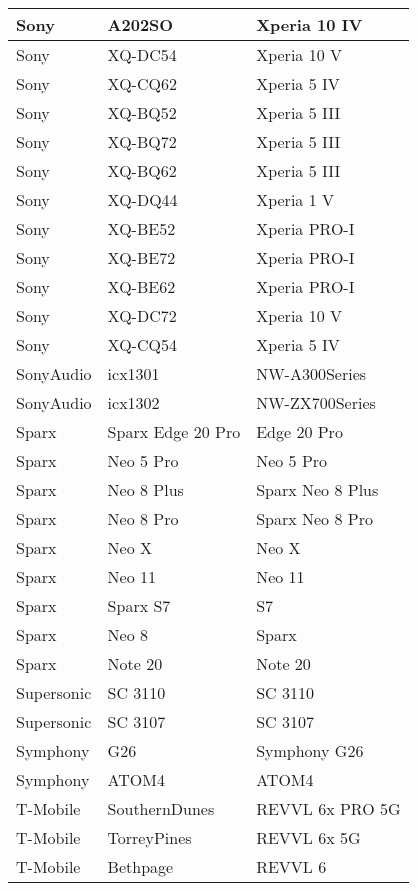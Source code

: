 \begin{tabularx}{\linewidth}{|l|X|X|}
        Sony & A202SO & Xperia 10 IV \\ \hline
        Sony & XQ-DC54 & Xperia 10 V \\ \hline
        Sony & XQ-CQ62 & Xperia 5 IV \\ \hline
        Sony & XQ-BQ52 & Xperia 5 III \\ \hline
        Sony & XQ-BQ72 & Xperia 5 III \\ \hline
        Sony & XQ-BQ62 & Xperia 5 III \\ \hline
        Sony & XQ-DQ44 & Xperia 1 V \\ \hline
        Sony & XQ-BE52 & Xperia PRO-I \\ \hline
        Sony & XQ-BE72 & Xperia PRO-I \\ \hline
        Sony & XQ-BE62 & Xperia PRO-I \\ \hline
        Sony & XQ-DC72 & Xperia 10 V \\ \hline
        Sony & XQ-CQ54 & Xperia 5 IV \\ \hline
        SonyAudio & icx1301 & NW-A300Series \\ \hline
        SonyAudio & icx1302 & NW-ZX700Series \\ \hline
        Sparx & Sparx Edge 20 Pro & Edge 20 Pro \\ \hline
        Sparx & Neo 5 Pro & Neo 5 Pro \\ \hline
        Sparx & Neo 8 Plus & Sparx Neo 8 Plus \\ \hline
        Sparx & Neo 8 Pro & Sparx Neo 8 Pro \\ \hline
        Sparx & Neo X & Neo X \\ \hline
        Sparx & Neo 11 & Neo 11 \\ \hline
        Sparx & Sparx S7 & S7 \\ \hline
        Sparx & Neo 8 & Sparx \\ \hline
        Sparx & Note 20 & Note 20 \\ \hline
        Supersonic & SC 3110 & SC 3110 \\ \hline
        Supersonic & SC 3107 & SC 3107 \\ \hline
        Symphony & G26 & Symphony G26 \\ \hline
        Symphony & ATOM4 & ATOM4 \\ \hline
        T-Mobile & SouthernDunes & REVVL 6x PRO 5G \\ \hline
        T-Mobile & TorreyPines & REVVL 6x 5G \\ \hline
        T-Mobile & Bethpage & REVVL 6 \\ \hline

\end{tabularx}
